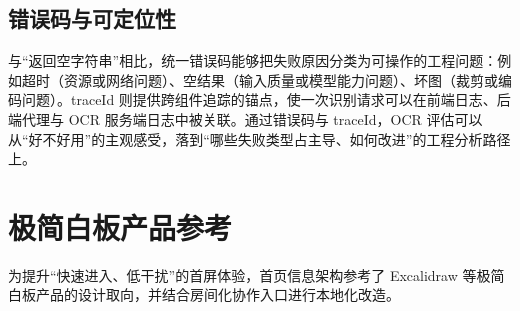 \subsection{错误码与可定位性}
与“返回空字符串”相比，统一错误码能够把失败原因分类为可操作的工程问题：例如超时（资源或网络问题）、空结果（输入质量或模型能力问题）、坏图（裁剪或编码问题）。traceId 则提供跨组件追踪的锚点，使一次识别请求可以在前端日志、后端代理与 OCR 服务端日志中被关联。通过错误码与 traceId，OCR 评估可以从“好不好用”的主观感受，落到“哪些失败类型占主导、如何改进”的工程分析路径上。

\section{极简白板产品参考}
为提升“快速进入、低干扰”的首屏体验，首页信息架构参考了 Excalidraw 等极简白板产品的设计取向，并结合房间化协作入口进行本地化改造。\cite{excalidraw}
